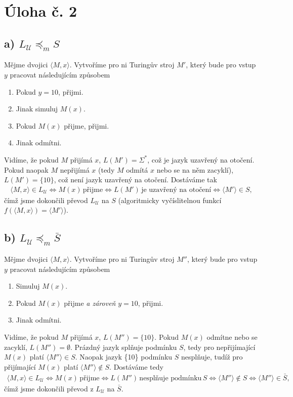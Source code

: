 \documentclass{scrartcl}
\begin{document}
    \section*{Úloha č. 2}
    \subsection*{a) $L_{\mathcal{U}} \preceq_m S$}
    Mějme dvojici $\langle M,x\rangle$. Vytvoříme pro ni Turingův stroj $M'$, který bude pro vstup $y$ pracovat následujícím způsobem
    \begin{enumerate}
        \item Pokud $y = 10$, přijmi.
        \item Jinak simuluj $M(x)$.
        \item Pokud $M(x)$ přijme, přijmi.
        \item Jinak odmítni.
    \end{enumerate}

    Vidíme, že pokud $M$ přijímá $x$, $L(M') = \Sigma^*$, což je jazyk uzavřený na otočení. Pokud naopak $M$ nepřijímá $x$ (tedy $M$ odmítá $x$ nebo se na něm zacyklí), $L(M') = \{10\}$, což není jazyk uzavřený na otočení. Dostáváme tak
    \begin{align*}
        \langle M,x\rangle \in L_{\mathcal{U}} \Leftrightarrow M(x)\,\text{přijme} \Leftrightarrow L(M')\,\text{je uzavřený na otočení} \Leftrightarrow \langle M'\rangle \in S,
    \end{align*}
    čímž jsme dokončili převod $L_{\mathcal{U}}$ na $S$ (algoritmicky vyčíslitelnou funkcí $f(\langle M,x\rangle) = \langle M'\rangle$).

    \subsection*{b) $L_{\mathcal{U}} \preceq_m \bar{S}$}
    Mějme dvojici $\langle M,x\rangle$. Vytvoříme pro ni Turingův stroj $M''$, který bude pro vstup $y$ pracovat následujícím způsobem
    \begin{enumerate}
        \item Simuluj $M(x)$.
        \item Pokud $M(x)$ přijme \emph{a zároveň} $y = 10$, přijmi.
        \item Jinak odmítni.
    \end{enumerate}
    
    Vidíme, že pokud $M$ přijímá $x$, $L(M'') = \{10\}$. Pokud $M(x)$ odmítne nebo se zacyklí, $L(M'') = \emptyset$. Prázdný jazyk splňuje podmínku $S$, tedy pro nepřijímající $M(x)$ platí $\langle M'' \rangle \in S$. Naopak jazyk \{10\} podmínku $S$ nesplňuje, tudíž pro přijímající $M(x)$ platí $\langle M'' \rangle \notin S$. Dostáváme tedy
    \begin{align*}
        \langle M,x\rangle \in L_{\mathcal{U}} \Leftrightarrow M(x)\,\text{přijme} \Leftrightarrow L(M'')\,\text{nesplňuje podmínku}\,S \Leftrightarrow \langle M'' \rangle \notin S \Leftrightarrow \langle M'' \rangle \in \bar{S},
    \end{align*}
    čímž jsme dokončili převod z $L_{\mathcal{U}}$ na $\bar{S}$.
\end{document}
